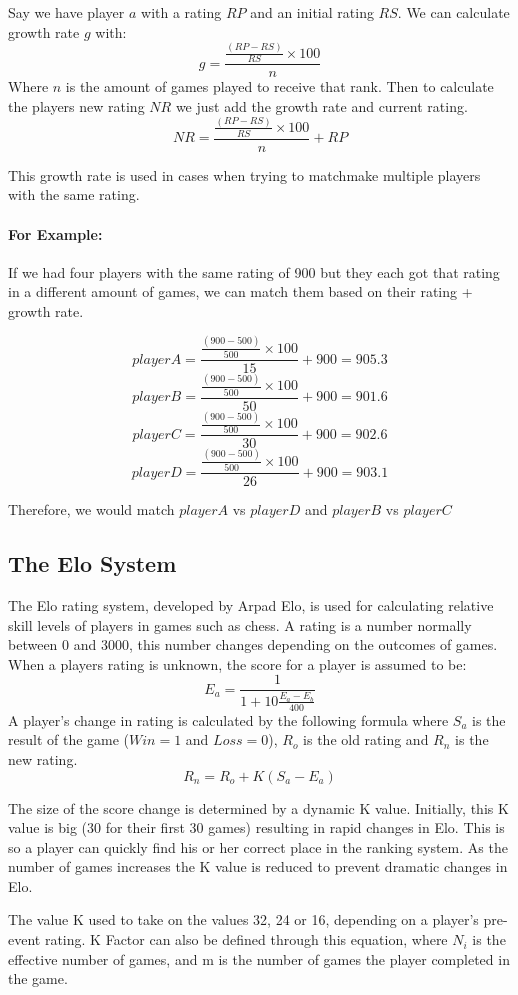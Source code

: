 \newpage
Say we have player $a$ with a rating $RP$ and an initial rating $RS$.
We can calculate growth rate $g$ with: 
\[ g = \frac{\frac{(RP - RS)}{RS} \times 100}{n} \] 
Where $n$ is the amount of games played to receive that rank.\hfill \break
Then to calculate the players new rating $NR$ we just add the growth rate and current rating.
\[ NR = \frac{\frac{(RP - RS)}{RS} \times 100}{n} + RP \]

This growth rate is used in cases when trying to matchmake multiple players with the same rating.\hfill

\paragraph{For Example:} If we had four players with the same rating of 900 but they each got that rating in a different amount of games, we can match them based on their rating + growth rate.

\[ player A = \frac{\frac{(900 - 500)}{500} \times 100}{15} + 900 = 905.3 \]
\[ player B = \frac{\frac{(900 - 500)}{500} \times 100}{50} + 900 = 901.6 \]
\[ player C = \frac{\frac{(900 - 500)}{500} \times 100}{30} + 900 = 902.6 \]
\[ player D = \frac{\frac{(900 - 500)}{500} \times 100}{26} + 900 = 903.1 \]

Therefore, we would match $player A$ vs $player D$ and $player B$ vs $player C$

\subsection{The Elo System}
The Elo rating system, developed by Arpad Elo, is used for calculating relative skill levels of players in games such as chess.\cite{glickman1999rating} A rating is a number normally between 0 and 3000, this number changes depending on the outcomes of games. When a players rating is unknown, the score for a player is assumed to be:
\[ E_a = \frac{1}{1+10\frac{E_a-E_b}{400}} \] \cite{pelanek2014application} A player's change in rating is calculated by the following formula where ${S_a}$ is the result of the game (${Win = 1}$ and $Loss = 0$), $R_o$ is the old rating and $R_n$ is the new rating.
\[ R_n = R_o + K(S_a - E_a) \]


{\raggedright The size of the score change is determined by a dynamic K value. Initially, this K value is big (30 for their first 30 games) resulting in rapid changes in Elo. This is so a player can quickly find his or her correct place in the ranking system. As the number of games increases the K value is reduced to prevent dramatic changes in Elo.}\newline
\cite{glickmanrating} The value K used to take on the values 32, 24 or 16, depending on a player’s pre-event rating. K Factor can also be defined through this equation, where $N_i$ is the effective number of games, and m is the number of games the player completed in the game.
